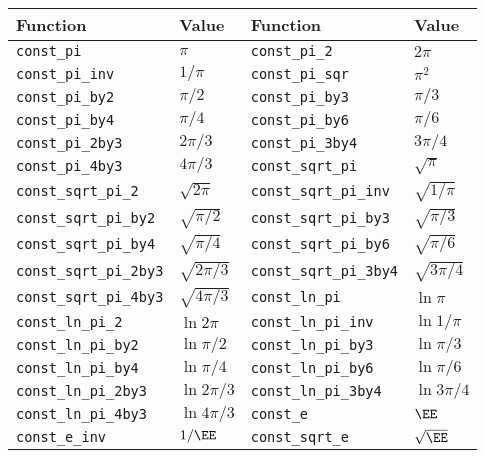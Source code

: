 \begin{table}
  \begin{tabularx}{\textwidth}{LLLL}
    \toprule
    Function & Value & Function & Value \\
    \midrule
    \verb|const_pi|           & $\pi$           &
    \verb|const_pi_2|         & $2\pi$          \\
    \verb|const_pi_inv|       & $1/\pi$         &
    \verb|const_pi_sqr|       & $\pi^2$         \\
    \verb|const_pi_by2|       & $\pi/2$         &
    \verb|const_pi_by3|       & $\pi/3$         \\
    \verb|const_pi_by4|       & $\pi/4$         &
    \verb|const_pi_by6|       & $\pi/6$         \\
    \verb|const_pi_2by3|      & $2\pi/3$        &
    \verb|const_pi_3by4|      & $3\pi/4$        \\
    \verb|const_pi_4by3|      & $4\pi/3$        &
    \verb|const_sqrt_pi|      & $\sqrt{\pi}$    \\
    \verb|const_sqrt_pi_2|    & $\sqrt{2\pi}$   &
    \verb|const_sqrt_pi_inv|  & $\sqrt{1/\pi}$  \\
    \verb|const_sqrt_pi_by2|  & $\sqrt{\pi/2}$  &
    \verb|const_sqrt_pi_by3|  & $\sqrt{\pi/3}$  \\
    \verb|const_sqrt_pi_by4|  & $\sqrt{\pi/4}$  &
    \verb|const_sqrt_pi_by6|  & $\sqrt{\pi/6}$  \\
    \verb|const_sqrt_pi_2by3| & $\sqrt{2\pi/3}$ &
    \verb|const_sqrt_pi_3by4| & $\sqrt{3\pi/4}$ \\
    \verb|const_sqrt_pi_4by3| & $\sqrt{4\pi/3}$ &
    \verb|const_ln_pi|        & $\ln{\pi}$      \\
    \verb|const_ln_pi_2|      & $\ln{2\pi}$     &
    \verb|const_ln_pi_inv|    & $\ln{1/\pi}$    \\
    \verb|const_ln_pi_by2|    & $\ln{\pi/2}$    &
    \verb|const_ln_pi_by3|    & $\ln{\pi/3}$    \\
    \verb|const_ln_pi_by4|    & $\ln{\pi/4}$    &
    \verb|const_ln_pi_by6|    & $\ln{\pi/6}$    \\
    \verb|const_ln_pi_2by3|   & $\ln{2\pi/3}$   &
    \verb|const_ln_pi_3by4|   & $\ln{3\pi/4}$   \\
    \verb|const_ln_pi_4by3|   & $\ln{4\pi/3}$   &
    \verb|const_e|            & $\EE$           \\
    \verb|const_e_inv|        & $1/\EE$         &
    \verb|const_sqrt_e|       & $\sqrt{\EE}$    \\

\end{tabularx}
\end{table}
